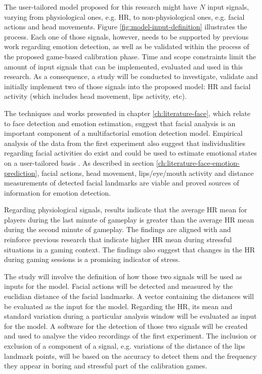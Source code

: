The user-tailored model proposed for this research might have $N$ input signals, varying from physiological ones, e.g. HR, to non-physiological ones, e.g. facial actions and head movements. Figure \ref{fig:model-input-definition} illustrates the process. Each one of those signals, however, needs to be supported by previous work regarding emotion detection, as well as be validated within the process of the proposed game-based calibration phase. Time and scope constraints limit the amount of input signals that can be implemented, evaluated and used in this research. As a consequence, a study will be conducted to investigate, validate and initially implement two of those signals into the proposed model: HR and facial activity (which includes head movement, lips activity, etc).

The techniques and works presented in chapter \ref{ch:literature-face}, which relate to face detection and emotion estimation, suggest that facial analysis is an important component of a multifactorial emotion detection model. Empirical analysis of the data from the first experiment also suggest that individualities regarding facial activities do exist and could be used to estimate emotional states on a user-tailored basis \parencite{bevilacqua2016variations}. As described in section \ref{ch:literature-face-emotion-prediction}, facial actions, head movement, lips/eye/mouth activity and distance measurements of detected facial landmarks are viable and proved sources of information for emotion detection.

Regarding physiological signals, results indicate that the average HR mean for players during the last minute of gameplay is greater than the average HR mean during the second minute of gameplay. The findings are aligned with and reinforce previous research that indicate higher HR mean during stressful situations in a gaming context. The findings also suggest that changes in the HR during gaming sessions is a promising indicator of stress.

The study will involve the definition of how those two signals will be used as inputs for the model. Facial actions will be detected and measured by the euclidian distance of the facial landmarks. A vector containing the distances will be evaluated as the input for the model. Regarding the HR, its mean and standard variation during a particular analysis window will be evaluated as input for the model. A software for the detection of those two signals will be created and used to analyse the video recordings of the first experiment. The inclusion or exclusion of a component of a signal, e.g. variations of the distance of the lips landmark points, will be based on the accuracy to detect them and the frequency they appear in boring and stressful part of the calibration games.

